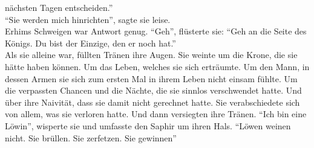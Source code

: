 nächsten Tagen entscheiden.''\\
``Sie werden mich hinrichten'', sagte sie leise.\\
Erhims Schweigen war Antwort genug. ``Geh'', flüsterte sie: ``Geh an die Seite des Königs. Du bist 
der Einzige, den er noch hat.''\\
Als sie alleine war, füllten Tränen ihre Augen. Sie weinte um die Krone, die sie hätte haben 
können. Um das Leben, welches sie sich erträumte. Um den Mann, in dessen Armen sie sich zum ersten 
Mal in ihrem Leben nicht einsam fühlte. Um die verpassten Chancen und die Nächte, die sie sinnlos 
verschwendet hatte. Und über ihre Naivität, dass sie damit nicht gerechnet hatte. Sie 
verabschiedete sich von allem, was sie verloren hatte. Und dann versiegten ihre Tränen. ``Ich bin 
eine Löwin'', wisperte sie und umfasste den Saphir um ihren Hals. ``Löwen weinen nicht. Sie 
brüllen. Sie zerfetzen. Sie gewinnen''\\


